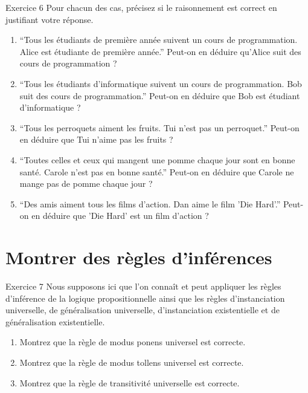 \documentclass[a4paper,11pt]{article}
\begin{document}
\begin{exercisebox}{Exercice 6}
Pour chacun des cas, précisez si le raisonnement est correct en justifiant votre réponse.

\begin{enumerate}
    \item ``Tous les étudiants de première année suivent un cours de programmation. Alice est étudiante de première année.'' Peut-on en déduire qu'Alice suit des cours de programmation ?
    
    \item ``Tous les étudiants d'informatique suivent un cours de programmation. Bob suit des cours de programmation.'' Peut-on en déduire que Bob est étudiant d'informatique ?
    
    \item ``Tous les perroquets aiment les fruits. Tui n'est pas un perroquet.'' Peut-on en déduire que Tui n'aime pas les fruits ?
    
    \item ``Toutes celles et ceux qui mangent une pomme chaque jour sont en bonne santé. Carole n'est pas en bonne santé.'' Peut-on en déduire que Carole ne mange pas de pomme chaque jour ?
    
    \item ``Des amis aiment tous les films d'action. Dan aime le film 'Die Hard'.'' Peut-on en déduire que 'Die Hard' est un film d'action ?
\end{enumerate}
\end{exercisebox}

\section{Montrer des règles d'inférences}

\begin{exercisebox}{Exercice 7}
Nous supposons ici que l'on connaît et peut appliquer les règles d'inférence de la logique propositionnelle ainsi que les règles d'instanciation universelle, de généralisation universelle, d'instanciation existentielle et de généralisation existentielle.

\begin{enumerate}
    \item Montrez que la règle de modus ponens universel est correcte.
    \item Montrez que la règle de modus tollens universel est correcte.
    \item Montrez que la règle de transitivité universelle est correcte.
\end{enumerate}
\end{exercisebox}
\end{document}
